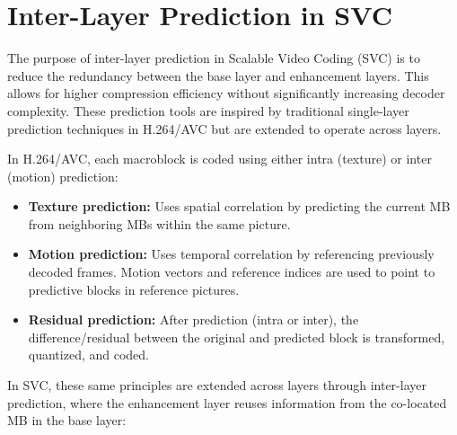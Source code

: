 

\section{Inter-Layer Prediction in SVC}
\label{sec:inter-layer-prediction}

    The purpose of inter-layer prediction in Scalable Video Coding (SVC) is to
    reduce the redundancy between the base layer and enhancement
    layers. This allows for higher compression efficiency without significantly
    increasing decoder complexity. These prediction tools are inspired by
    traditional single-layer prediction techniques in H.264/AVC but are extended
    to operate across layers.

    In H.264/AVC, each macroblock is coded using either intra (texture) or inter (motion)
    prediction:

    \begin{itemize}
        \item 
            \textbf{Texture prediction:} 
            Uses spatial correlation by predicting the current MB from
            neighboring MBs within the same picture.

        \item 
            \textbf{Motion prediction:} 
            Uses temporal correlation by referencing previously decoded frames.
            Motion vectors and reference indices are used to point to predictive
            blocks in reference pictures.

        \item 
            \textbf{Residual prediction:} 
            After prediction (intra or inter), the difference/residual between the
            original and predicted block is transformed,
            quantized, and coded.
    \end{itemize}

    In SVC, these same principles are extended across layers through inter-layer
    prediction, where the enhancement layer reuses information from the
    co-located MB in the base layer:

